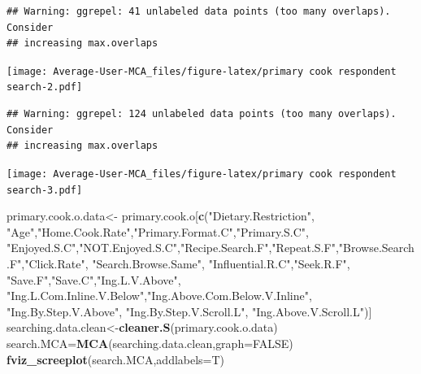 \documentclass[
]{article}
\newenvironment{Shaded}{\begin{snugshade}}{\end{snugshade}}
\newcommand{\DataTypeTok}[1]{\textcolor[rgb]{0.13,0.29,0.53}{#1}}
\newcommand{\KeywordTok}[1]{\textcolor[rgb]{0.13,0.29,0.53}{\textbf{#1}}}
\newcommand{\NormalTok}[1]{#1}
\newcommand{\OtherTok}[1]{\textcolor[rgb]{0.56,0.35,0.01}{#1}}
\newcommand{\StringTok}[1]{\textcolor[rgb]{0.31,0.60,0.02}{#1}}
\begin{document}
\begin{verbatim}
## Warning: ggrepel: 41 unlabeled data points (too many overlaps). Consider
## increasing max.overlaps
\end{verbatim}

\texttt{[image: Average-User-MCA\_files/figure-latex/primary cook respondent search-2.pdf]}

\begin{Shaded}
\end{Shaded}

\begin{verbatim}
## Warning: ggrepel: 124 unlabeled data points (too many overlaps). Consider
## increasing max.overlaps
\end{verbatim}

\texttt{[image: Average-User-MCA\_files/figure-latex/primary cook respondent search-3.pdf]}

\begin{Shaded}
\begin{Highlighting}[]
\NormalTok{primary.cook.o.data<-}\StringTok{ }\NormalTok{primary.cook.o[}\KeywordTok{c}\NormalTok{(}\StringTok{"Dietary.Restriction"}\NormalTok{, }\StringTok{"Age"}\NormalTok{,}\StringTok{"Home.Cook.Rate"}\NormalTok{,}\StringTok{"Primary.Format.C"}\NormalTok{,}\StringTok{"Primary.S.C"}\NormalTok{,}
            \StringTok{"Enjoyed.S.C"}\NormalTok{,}\StringTok{"NOT.Enjoyed.S.C"}\NormalTok{,}\StringTok{"Recipe.Search.F"}\NormalTok{,}\StringTok{"Repeat.S.F"}\NormalTok{,}\StringTok{"Browse.Search.F"}\NormalTok{,}\StringTok{"Click.Rate"}\NormalTok{,}
            \StringTok{"Search.Browse.Same"}\NormalTok{, }\StringTok{"Influential.R.C"}\NormalTok{,}\StringTok{"Seek.R.F"}\NormalTok{, }\StringTok{"Save.F"}\NormalTok{,}\StringTok{"Save.C"}\NormalTok{,}\StringTok{"Ing.L.V.Above"}\NormalTok{,}
            \StringTok{"Ing.L.Com.Inline.V.Below"}\NormalTok{,}\StringTok{"Ing.Above.Com.Below.V.Inline"}\NormalTok{,  }\StringTok{"Ing.By.Step.V.Above"}\NormalTok{,  }\StringTok{"Ing.By.Step.V.Scroll.L"}\NormalTok{,}
            \StringTok{"Ing.Above.V.Scroll.L"}\NormalTok{)]}
\NormalTok{searching.data.clean<-}\KeywordTok{cleaner.S}\NormalTok{(primary.cook.o.data)}
\NormalTok{search.MCA=}\KeywordTok{MCA}\NormalTok{(searching.data.clean,}\DataTypeTok{graph=}\OtherTok{FALSE}\NormalTok{)}
\KeywordTok{fviz_screeplot}\NormalTok{(search.MCA,}\DataTypeTok{addlabels=}\NormalTok{T)}
\end{Highlighting}
\end{Shaded}
\end{document}
